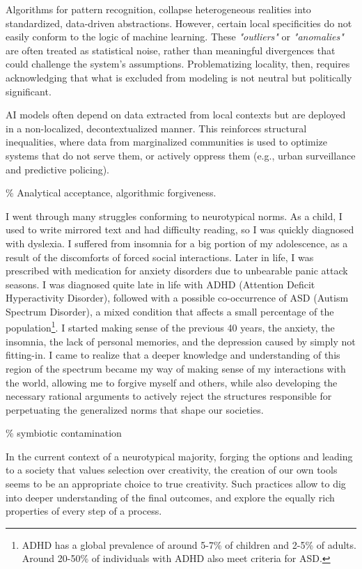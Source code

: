 Algorithms for pattern recognition, collapse heterogeneous realities into standardized, data-driven abstractions. However, certain local specificities do not easily conform to the logic of machine learning. These \textit{"outliers"} or \textit{"anomalies"} are often treated as statistical noise, rather than meaningful divergences that could challenge the system's assumptions. Problematizing locality, then, requires acknowledging that what is excluded from modeling is not neutral but politically significant.

AI models often depend on data extracted from local contexts but are deployed in a non-localized, decontextualized manner. This reinforces structural inequalities, where data from marginalized communities is used to optimize systems that do not serve them, or actively oppress them (e.g., urban surveillance and predictive policing).

{\scriptsize \textcolor{comment}{\% Analytical acceptance, algorithmic forgiveness. }}

I went through many struggles conforming to neurotypical norms. As a child, I used to write mirrored text and had difficulty reading, so I was quickly diagnosed with dyslexia. I suffered from insomnia for a big portion of my adolescence, as a result of the discomforts of forced social interactions. Later in life, I was prescribed with medication for anxiety disorders due to unbearable panic attack seasons. I was diagnosed quite late in life with ADHD (Attention Deficit Hyperactivity Disorder), followed with a possible co-occurrence of ASD (Autism Spectrum Disorder), a mixed condition that affects a small percentage of the population\footnote{ADHD has a global prevalence of around 5-7\% of children and 2-5\% of adults. Around 20-50\% of individuals with ADHD also meet criteria for ASD.}. I started making sense of the previous 40 years, the anxiety, the insomnia, the lack of personal memories, and the depression caused by simply not fitting-in. I came to realize that a deeper knowledge and understanding of this region of the spectrum became my way of making sense of my interactions with the world, allowing me to forgive myself and others, while also developing the necessary rational arguments to actively reject the structures responsible for perpetuating the generalized norms that shape our societies.

{\scriptsize \textcolor{comment}{\% symbiotic contamination}}

In the current context of a neurotypical majority, forging the options and leading to a society that values selection over creativity, the creation of our own tools seems to be an appropriate choice to true creativity. Such practices allow to dig into deeper understanding of the final outcomes, and explore the equally rich properties of every step of a process.  

